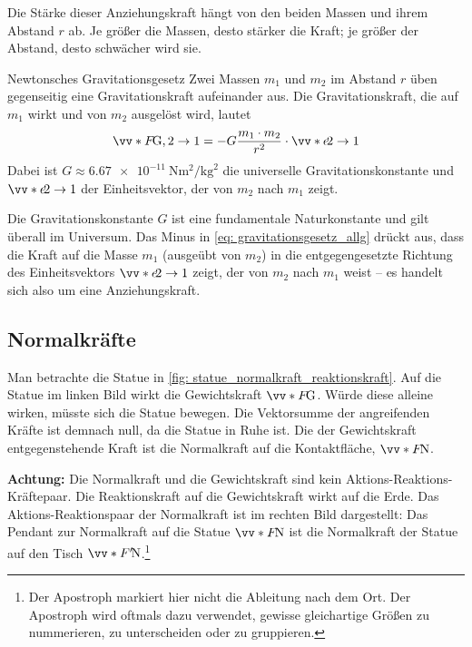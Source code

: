 Die Stärke dieser Anziehungskraft hängt von den beiden Massen und ihrem Abstand $r$ ab. Je größer die Massen, desto stärker die Kraft; je größer der Abstand, desto schwächer wird sie.
\begin{importantbox}[]{Newtonsches Gravitationsgesetz}
    Zwei Massen $m_1$ und $m_2$ im Abstand $r$ üben gegenseitig eine Gravitationskraft aufeinander aus. Die Gravitationskraft, die auf $m_1$ wirkt und von $m_2$ ausgelöst wird, lautet
    \begin{equation}\label{eq: gravitationsgesetz_allg}
        \ivecS{F}{\text{G}, 2\rightarrow 1} = -G \frac{m_1 \cdot m_2}{r^2} \cdot \ivecS{e}{2\rightarrow 1}
    \end{equation}
    Dabei ist $G \approx \SI{6.67e-11}{\newton\meter\squared\per\kilogram\squared}$ die universelle Gravitationskonstante und $\ivecS{e}{2\rightarrow 1}$ der Einheitsvektor, der von $m_2$ nach $m_1$ zeigt. 
\end{importantbox}
Die Gravitationskonstante $G$ ist eine fundamentale Naturkonstante und gilt überall im Universum. Das Minus in \cref{eq: gravitationsgesetz_allg} drückt aus, dass die Kraft auf die Masse $m_1$ (ausgeübt von $m_2$) in die entgegengesetzte Richtung des Einheitsvektors $\ivecS{e}{2\rightarrow 1}$ zeigt, der von $m_2$ nach $m_1$ weist – es handelt sich also um eine Anziehungskraft.

\subsection{Normalkräfte}
Man betrachte die Statue in \cref{fig: statue_normalkraft_reaktionskraft}. Auf die Statue im linken Bild wirkt die Gewichtskraft $\ivecS{F}{\text{G}}$. Würde diese alleine wirken, müsste sich die Statue bewegen. Die Vektorsumme der angreifenden Kräfte ist demnach null, da die Statue in Ruhe ist. Die der Gewichtskraft entgegenstehende Kraft ist die Normalkraft auf die Kontaktfläche, $\ivecS{F}{\text{N}}$. 

\textbf{Achtung:} Die Normalkraft und die Gewichtskraft sind kein Aktions-Reaktions-Kräftepaar. Die Reaktionskraft auf die Gewichtskraft wirkt auf die Erde. Das Aktions-Reaktionspaar der Normalkraft ist im rechten Bild dargestellt: Das Pendant zur Normalkraft auf die Statue $\ivecS{F}{\text{N}}$ ist die Normalkraft der Statue auf den Tisch $\ivecS{F'}{\text{N}}$.\footnote{Der Apostroph markiert hier nicht die Ableitung nach dem Ort. Der Apostroph wird oftmals dazu verwendet, gewisse gleichartige Größen zu nummerieren, zu unterscheiden oder zu gruppieren.} 

